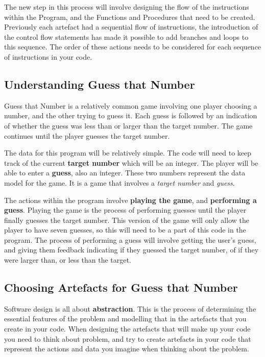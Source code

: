 The new step in this process will involve designing the flow of the instructions within the Program, and the Functions and Procedures that need to be created. Previously each artefact had a sequential flow of instructions, the introduction of the control flow statements has made it possible to add branches and loops to this sequence. The order of these actions needs to be considered for each sequence of instructions in your code.


\clearpage
\subsection{Understanding Guess that Number} %
\label{sub:understanding_guess_that_number}

Guess that Number is a relatively common game involving one player choosing a number, and the other trying to guess it. Each guess is followed by an indication of whether the guess was less than or larger than the target number. The game continues until the player guesses the target number.

The data for this program will be relatively simple. The code will need to keep track of the current \textbf{target number} which will be an integer. The player will be able to enter a \textbf{guess}, also an integer. These two numbers represent the data model for the game. It is a game that involves a \emph{target number} and \emph{guess}.

The actions within the program involve \textbf{playing the game}, and \textbf{performing a guess}. Playing the game is the process of performing guesses until the player finally guesses the target number. This version of the game will only allow the player to have seven guesses, so this will need to be a part of this code in the program. The process of performing a guess will involve getting the user's guess, and giving them feedback indicating if they guessed the target number, of if they were larger than, or less than the target.


\subsection{Choosing Artefacts for Guess that Number} %
\label{sub:choosing_artefacts_for_guess_that_number}

Software design is all about \textbf{abstraction}. This is the process of determining the essential features of the problem and modelling that in the artefacts that you create in your code. When designing the artefacts that will make up your code you need to think about problem, and try to create artefacts in your code that represent the actions and data you imagine when thinking about the problem.

